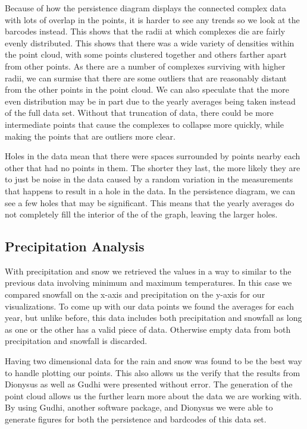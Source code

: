 \documentclass[12pt]{report}
\begin{document}
Because of how the persistence diagram displays the connected complex data with lots of overlap in the points, it is harder to see any trends so we look at the barcodes instead. This shows that the radii at which complexes die are fairly evenly distributed. This shows that there was a wide variety of densities within the point cloud, with some points clustered together and others farther apart from other points. As there are a number of complexes surviving with higher radii, we can surmise that there are some outliers that are reasonably distant from the other points in the point cloud. We can also speculate that the more even distribution may be in part due to the yearly averages being taken instead of the full data set. Without that truncation of data, there could be more intermediate points that cause the complexes to collapse more quickly, while making the points that are outliers more clear. 

Holes in the data mean that there were spaces surrounded by points nearby each other that had no points in them. The shorter they last, the more likely they are to just be noise in the data caused by a random variation in the measurements that happens to result in a hole in the data. In the persistence diagram, we can see a few holes that may be significant. This means that the yearly averages do not completely fill the interior of the of the graph, leaving the larger holes.







\clearpage
\subsection*{Precipitation Analysis}
With precipitation and snow we retrieved the values in a way to similar to the previous data involving minimum and maximum temperatures. In this case we compared snowfall on the x-axis and precipitation on the y-axis for our visualizations. To come up with our data points we found the averages for each year, but unlike before, this data includes both precipitation and snowfall as long as one or the other has a valid piece of data. Otherwise empty data from both precipitation and snowfall is discarded.\par 

Having two dimensional data for the rain and snow was found to be the best way to handle plotting our points. This also allows us the verify that the results from Dionysus as well as Gudhi were presented without error. The generation of the point cloud allows us the further learn more about the data we are working with. By using Gudhi, another software package, and Dionysus we were able to generate figures for both the persistence and bardcodes of this data set.\par
\end{document}
